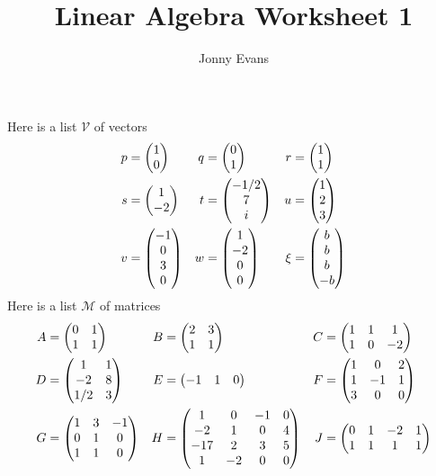 \documentclass{article}
\title{Linear Algebra Worksheet 1}
\author{Jonny Evans}
\date{\vspace{-1cm}}
\begin{document}
\maketitle
\setcounter{section}{1}


Here is a list \(\mathcal{V}\) of vectors
\begin{align*}
p&=\begin{pmatrix} 1 \\ 0\end{pmatrix}& q&=\begin{pmatrix} 0 \\ 1\end{pmatrix} & r&=\begin{pmatrix} 1\\ 1\end{pmatrix}\\
s&=\begin{pmatrix} 1 \\ -2\end{pmatrix}& t&=\begin{pmatrix} -1/2 \\ 7 \\ i\end{pmatrix}& u&=\begin{pmatrix} 1 \\ 2 \\ 3\end{pmatrix}\\
v&=\begin{pmatrix} -1 \\ 0 \\ 3 \\ 0\end{pmatrix}& w&=\begin{pmatrix} 1 \\ -2 \\ 0 \\ 0\end{pmatrix} &\xi&=\begin{pmatrix} b\\ b\\ b\\ -b\end{pmatrix}
\end{align*}
Here is a list \(\mathcal{M}\) of matrices
\begin{align*}
A&=\begin{pmatrix} 0 & 1 \\ 1 & 1\end{pmatrix}&B&=\begin{pmatrix} 2 & 3 \\ 1 & 1\end{pmatrix}&C&=\begin{pmatrix} 1 & 1 & 1\\ 1 & 0 & -2\end{pmatrix}\\
D&=\begin{pmatrix} 1 & 1 \\ -2 & 8 \\ 1/2 & 3\end{pmatrix}&E&=\begin{pmatrix} -1 & 1 & 0\end{pmatrix}& F&=\begin{pmatrix} 1 & 0 & 2 \\ 1 & -1 & 1 \\ 3 & 0 & 0\end{pmatrix}\\
G&=\begin{pmatrix} 1 & 3 & -1\\ 0 & 1 & 0 \\ 1 & 1 & 0\end{pmatrix}&H&=\begin{pmatrix} 1 & 0 & -1 & 0 \\ -2 & 1 & 0 & 4 \\ -17 & 2 & 3 & 5 \\ 1 & -2 & 0 & 0\end{pmatrix}&J&=\begin{pmatrix} 0 & 1 & -2 & 1 \\ 1 & 1 & 1 & 1 \end{pmatrix}
\end{align*}
\end{document}
